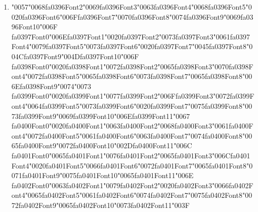 \documentclass[12pt]{article}
\begin{document}
\begin{enumerate}[label=Q\arabic*.]
 \item {\char"0057}{\char"0068}{\csname fa0396Font2\endcsname\char"0069}{\csname fa0396Font3\endcsname\char"0063}{\csname fa0396Font4\endcsname\char"0068}{\csname fa0396Font5\endcsname\char"0020}{\csname fa0396Font6\endcsname\char"006F}{\csname fa0396Font7\endcsname\char"0070}{\csname fa0396Font8\endcsname\char"0074}{\csname fa0396Font9\endcsname\char"0069}{\csname fa0396Font10\endcsname\char"006F} {\csname fa0397Font0\endcsname\char"006E}{\csname fa0397Font1\endcsname\char"0020}{\csname fa0397Font2\endcsname\char"0073}{\csname fa0397Font3\endcsname\char"0061}{\csname fa0397Font4\endcsname\char"0079}{\csname fa0397Font5\endcsname\char"0073}{\csname fa0397Font6\endcsname\char"0020}{\csname fa0397Font7\endcsname\char"0045}{\csname fa0397Font8\endcsname\char"004C}{\csname fa0397Font9\endcsname\char"004D}{\csname fa0397Font10\endcsname\char"006F} {\csname fa0398Font0\endcsname\char"0020}{\csname fa0398Font1\endcsname\char"0072}{\csname fa0398Font2\endcsname\char"0065}{\csname fa0398Font3\endcsname\char"0070}{\csname fa0398Font4\endcsname\char"0072}{\csname fa0398Font5\endcsname\char"0065}{\csname fa0398Font6\endcsname\char"0073}{\csname fa0398Font7\endcsname\char"0065}{\csname fa0398Font8\endcsname\char"006E}{\csname fa0398Font9\endcsname\char"0074}{\char"0073} {\csname fa0399Font0\endcsname\char"0020}{\csname fa0399Font1\endcsname\char"0077}{\csname fa0399Font2\endcsname\char"006F}{\csname fa0399Font3\endcsname\char"0072}{\csname fa0399Font4\endcsname\char"0064}{\csname fa0399Font5\endcsname\char"0073}{\csname fa0399Font6\endcsname\char"0020}{\csname fa0399Font7\endcsname\char"0075}{\csname fa0399Font8\endcsname\char"0073}{\csname fa0399Font9\endcsname\char"0069}{\csname fa0399Font10\endcsname\char"006E}{\csname fa0399Font11\endcsname\char"0067} {\csname fa0400Font0\endcsname\char"0020}{\csname fa0400Font1\endcsname\char"0063}{\csname fa0400Font2\endcsname\char"0068}{\csname fa0400Font3\endcsname\char"0061}{\csname fa0400Font4\endcsname\char"0072}{\csname fa0400Font5\endcsname\char"0061}{\csname fa0400Font6\endcsname\char"0063}{\csname fa0400Font7\endcsname\char"0074}{\csname fa0400Font8\endcsname\char"0065}{\csname fa0400Font9\endcsname\char"0072}{\csname fa0400Font10\endcsname\char"002D}{\csname fa0400Font11\endcsname\char"006C} {\csname fa0401Font0\endcsname\char"0065}{\csname fa0401Font1\endcsname\char"0076}{\csname fa0401Font2\endcsname\char"0065}{\csname fa0401Font3\endcsname\char"006C}{\csname fa0401Font4\endcsname\char"0020}{\csname fa0401Font5\endcsname\char"0066}{\csname fa0401Font6\endcsname\char"0072}{\csname fa0401Font7\endcsname\char"0065}{\csname fa0401Font8\endcsname\char"0071}{\csname fa0401Font9\endcsname\char"0075}{\csname fa0401Font10\endcsname\char"0065}{\csname fa0401Font11\endcsname\char"006E} {\csname fa0402Font0\endcsname\char"0063}{\csname fa0402Font1\endcsname\char"0079}{\csname fa0402Font2\endcsname\char"0020}{\csname fa0402Font3\endcsname\char"0066}{\csname fa0402Font4\endcsname\char"0065}{\csname fa0402Font5\endcsname\char"0061}{\csname fa0402Font6\endcsname\char"0074}{\csname fa0402Font7\endcsname\char"0075}{\csname fa0402Font8\endcsname\char"0072}{\csname fa0402Font9\endcsname\char"0065}{\csname fa0402Font10\endcsname\char"0073}{\csname fa0402Font11\endcsname\char"003F}

\end{enumerate}
\end{document}
